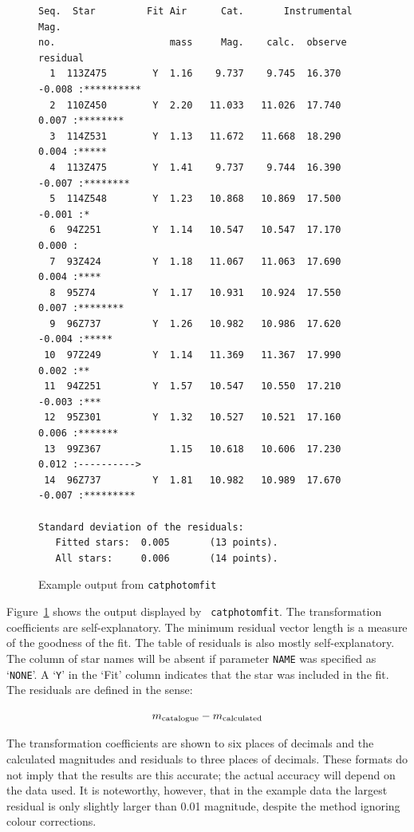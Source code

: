 \documentclass[twoside,11pt]{article}
\begin{document}
\begin{enumerate}
\begin{figure}[htbp]
\begin{verbatim}
Seq.  Star         Fit Air      Cat.       Instrumental Mag.
no.                    mass     Mag.    calc.  observe residual
  1  113Z475        Y  1.16    9.737    9.745  16.370  -0.008 :**********
  2  110Z450        Y  2.20   11.033   11.026  17.740   0.007 :********
  3  114Z531        Y  1.13   11.672   11.668  18.290   0.004 :*****
  4  113Z475        Y  1.41    9.737    9.744  16.390  -0.007 :********
  5  114Z548        Y  1.23   10.868   10.869  17.500  -0.001 :*
  6  94Z251         Y  1.14   10.547   10.547  17.170   0.000 :
  7  93Z424         Y  1.18   11.067   11.063  17.690   0.004 :****
  8  95Z74          Y  1.17   10.931   10.924  17.550   0.007 :********
  9  96Z737         Y  1.26   10.982   10.986  17.620  -0.004 :*****
 10  97Z249         Y  1.14   11.369   11.367  17.990   0.002 :**
 11  94Z251         Y  1.57   10.547   10.550  17.210  -0.003 :***
 12  95Z301         Y  1.32   10.527   10.521  17.160   0.006 :*******
 13  99Z367            1.15   10.618   10.606  17.230   0.012 :---------->
 14  96Z737         Y  1.81   10.982   10.989  17.670  -0.007 :*********

Standard deviation of the residuals:
   Fitted stars:  0.005       (13 points).
   All stars:     0.006       (14 points).
\end{verbatim}

\begin{quote}
\caption{Example output from {\tt catphotomfit}
\label{PHOTOFITOUT} }
\end{quote}

\end{figure}

   Figure~\ref{PHOTOFITOUT} shows the output displayed by {\tt
   catphotomfit}.  The transformation coefficients are self-explanatory.
   The minimum residual vector length is a measure of the goodness of the
   fit.  The table of residuals is also mostly self-explanatory.  The column
   of star names will be absent if parameter {\tt NAME} was specified as
   `{\tt NONE}'.  A `{\tt Y}' in the `Fit' column indicates that the star
   was included in the fit.  The residuals are defined in the sense:

  \begin{equation}
   m_{\rm catalogue} - m_{\rm calculated}
  \end{equation}

   The transformation coefficients are shown to six places of decimals
   and the calculated magnitudes and residuals to three places of
   decimals.  These formats do not imply that the results are this
   accurate; the actual accuracy will depend on the data used.  It is
   noteworthy, however, that in the example data the largest residual is
   only slightly larger than 0.01 magnitude, despite the method ignoring
   colour corrections.


\end{enumerate}
\end{document}
